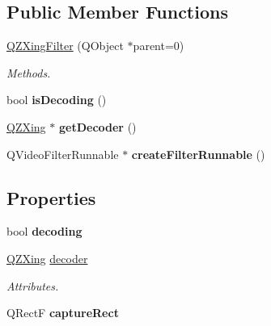 \subsection*{Public Member Functions}
\begin{DoxyCompactItemize}
\item 
\mbox{\hyperlink{class_q_z_xing_filter_a544277b8424ac9f41506ec7aa3e22395}{Q\+Z\+Xing\+Filter}} (Q\+Object $\ast$parent=0)
\begin{DoxyCompactList}\small\item\em Methods. \end{DoxyCompactList}\item 
\mbox{\label{class_q_z_xing_filter_ab521b894ab12bcdf03008d14611b78fe}} 
bool {\bfseries is\+Decoding} ()
\item 
\mbox{\label{class_q_z_xing_filter_a5611cb75622ee914dc872a66df16fcae}} 
\mbox{\hyperlink{class_q_z_xing}{Q\+Z\+Xing}} $\ast$ {\bfseries get\+Decoder} ()
\item 
\mbox{\label{class_q_z_xing_filter_a910871b3db3f32a9cc5da90e62c10981}} 
Q\+Video\+Filter\+Runnable $\ast$ {\bfseries create\+Filter\+Runnable} ()
\end{DoxyCompactItemize}
\subsection*{Properties}
\begin{DoxyCompactItemize}
\item 
\mbox{\label{class_q_z_xing_filter_aa48e582a7444c776a49dac60845feaac}} 
bool {\bfseries decoding}
\item 
\mbox{\label{class_q_z_xing_filter_a27f032211d1d4eea1affed0e7618436d}} 
\mbox{\hyperlink{class_q_z_xing}{Q\+Z\+Xing}} \mbox{\hyperlink{class_q_z_xing_filter_a27f032211d1d4eea1affed0e7618436d}{decoder}}
\begin{DoxyCompactList}\small\item\em Attributes. \end{DoxyCompactList}\item 
\mbox{\label{class_q_z_xing_filter_a3322e9a2b3bc15fb460f095f45ed49ff}} 
Q\+RectF {\bfseries capture\+Rect}
\end{DoxyCompactItemize}
